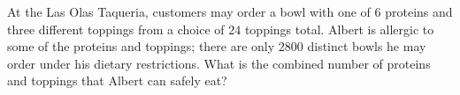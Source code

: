 At the Las Olas Taqueria, customers may order a bowl with one of $6$ proteins and three different toppings from a choice of $24$ toppings total. Albert is allergic to some of the proteins and toppings; there are only $2800$ distinct bowls he may order under his dietary restrictions. What is the combined number of proteins and toppings that Albert can safely eat?
